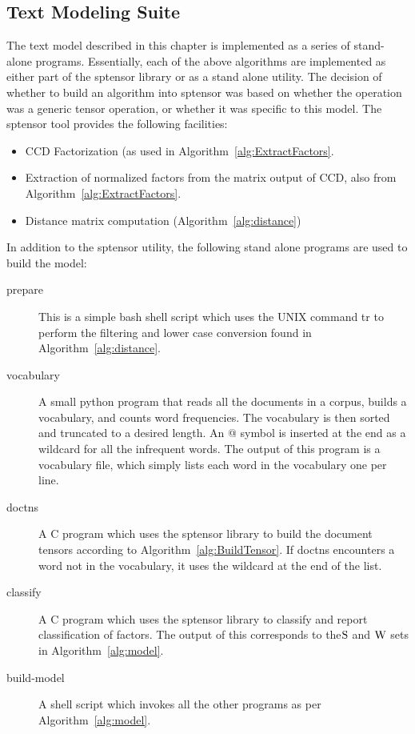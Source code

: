 \documentclass[../ut-dissertation.tex]{subfiles}
\begin{document}
\subsection{Text Modeling Suite}
The text model described in this chapter is implemented as a series of
stand-alone programs.  Essentially, each of the above algorithms are
implemented as either part of the sptensor library or as a stand alone
utility.  The decision of whether to build an algorithm into sptensor
was based on whether the operation was a generic tensor operation, or
whether it was specific to this model.  The sptensor tool provides the
following facilities:
\begin{itemize}
\item CCD Factorization (as used in
  Algorithm~\ref{alg:ExtractFactors}.
\item Extraction of normalized factors from the matrix output of CCD,
  also from Algorithm~\ref{alg:ExtractFactors}.
\item Distance matrix computation (Algorithm~\ref{alg:distance})
\end{itemize}

In addition to the sptensor utility, the following stand alone
programs are used to build the model:
\begin{description}
\item[prepare] This is a simple bash shell script which uses the UNIX
  command tr to perform the filtering and lower case conversion found
  in Algorithm~\ref{alg:distance}.
\item[vocabulary] A small python program that reads all the documents
  in a corpus, builds a vocabulary, and counts word frequencies.  The
  vocabulary is then sorted and truncated to a desired length.  An @
  symbol is inserted at the end as a wildcard for all the infrequent
  words.  The output of this program is a vocabulary file, which
  simply lists each word in the vocabulary one per line.
\item[doctns] A C program which uses the sptensor library to build the
  document tensors according to Algorithm~\ref{alg:BuildTensor}.  If
  doctns encounters a word not in the vocabulary, it uses the wildcard
  at the end of the list.
\item[classify] A C program which uses the sptensor library to
  classify and report classification of factors.  The output of this
  corresponds to the$\mathrm{S}$ and $\mathrm{W}$ sets in Algorithm~\ref{alg:model}.
\item[build-model] A shell script which invokes all the other
  programs as per Algorithm~\ref{alg:model}.
\end{description}
\end{document}
